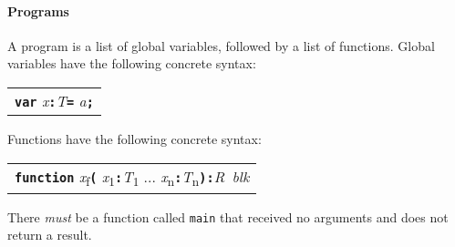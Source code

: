 \documentclass{book}
\newcommand{\kw}[1]{\textbf{\texttt{#1}}}
\newcommand{\metavar}[1]{\textit{#1}}
\begin{document}
\paragraph{Programs}
A program is a list of global variables, followed by a list of functions.
Global variables have the following concrete syntax:

\begin{tabular}{l}
\kw{var} \metavar{x}\kw{:}\metavar{T}\kw{=} \metavar{a}\kw{;} 
\end{tabular}

Functions have the following concrete syntax:

\begin{tabular}{l}
\kw{function} \metavar{x}\textsubscript{f}\kw{(} 
\metavar{x}\textsubscript{1}\kw{:}\metavar{T}\textsubscript{1} ... \metavar{x}\textsubscript{n}\kw{:}\metavar{T}\textsubscript{n}\kw{):}\metavar{R}\kw{ }\metavar{blk}
\end{tabular}

There \emph{must} be a function called \texttt{main} that received no arguments
and does not return a result.
\end{document}
